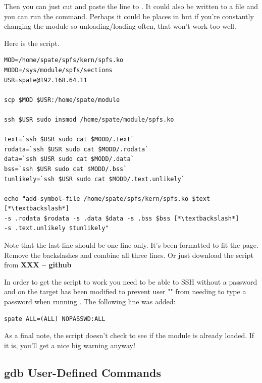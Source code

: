 \noindent
Then you can just cut and paste the  line to . It could also be written to a file and you can run the  command. Perhaps it could be places in  but if you're constantly changing the module so unloading/loading often, that won't work too well.

Here is the script. 

\begin{lstlisting}
MOD=/home/spate/spfs/kern/spfs.ko
MODD=/sys/module/spfs/sections
USR=spate@192.168.64.11

scp $MOD $USR:/home/spate/module

ssh $USR sudo insmod /home/spate/module/spfs.ko

text=`ssh $USR sudo cat $MODD/.text`
rodata=`ssh $USR sudo cat $MODD/.rodata`
data=`ssh $USR sudo cat $MODD/.data`
bss=`ssh $USR sudo cat $MODD/.bss`
tunlikely=`ssh $USR sudo cat $MODD/.text.unlikely`

echo "add-symbol-file /home/spate/spfs/kern/spfs.ko $text [*\textbackslash*]
-s .rodata $rodata -s .data $data -s .bss $bss [*\textbackslash*]
-s .text.unlikely $tunlikely"
\end{lstlisting}

\noindent
Note that the last line should be one line only. It's been formatted to fit the page. Remove the backslashes and combine all three lines. Or just download the script from \textbf{XXX -- github}

In order to get the script to work you need to be able to SSH without a password and  on the target has been modified to prevent user "" from needing to type a password when running . The following line was added:

\begin{lstlisting}
spate ALL=(ALL) NOPASSWD:ALL
\end{lstlisting}

\noindent
As a final note, the script doesn't check to see if the module is already loaded. If it is, you'll get a nice big warning anyway!


\subsection{gdb User-Defined Commands}

